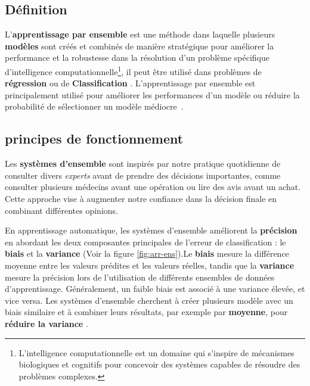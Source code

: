 \subsection{Définition}

L'\textbf{apprentissage par ensemble} est une méthode dans laquelle plusieurs \textbf{modèles} sont créés et combinés de manière stratégique pour améliorer la performance et la robustesse dans la résolution d'un problème spécifique d'intelligence computationnelle\footnote{L'intelligence computationnelle est un domaine qui s'inspire de mécanismes biologiques et cognitifs pour concevoir des systèmes capables de résoudre des problèmes complexes.}, il peut être utilisé dans problèmes de \textbf{régression} ou de \textbf{Classification} . L'apprentissage par ensemble est principalement utilisé pour améliorer les performances d'un modèle ou réduire la probabilité de sélectionner un modèle médiocre~\cite{Machine2020Batta}. 

\subsection{principes de fonctionnement}
Les \textbf{systèmes d'ensemble} sont inspirés par notre pratique quotidienne de consulter divers \textit{experts} avant de prendre des décisions importantes, comme consulter plusieurs médecins avant une opération ou lire des avis avant un achat. Cette approche vise à augmenter notre confiance dans la décision finale en combinant différentes opinions.

En apprentissage automatique, les systèmes d'ensemble améliorent la \textbf{précision} en abordant les deux composantes principales de l'erreur de classification : le \textbf{biais} et la \textbf{variance} (Voir la figure \ref{fig:arr-ens}).Le \textbf{biais} mesure la différence moyenne entre les valeurs prédites et les valeurs réelles, tandis que la \textbf{variance} mesure la précision lors de l'utilisation de différents ensembles de données d'apprentissage. Généralement, un faible biais est associé à une variance élevée, et vice versa. Les systèmes d'ensemble cherchent à créer plusieurs modèle avec un biais similaire et à combiner leurs résultats, par exemple par \textbf{moyenne}, pour \textbf{réduire la variance} \cite{polikar2012ensemble}.

